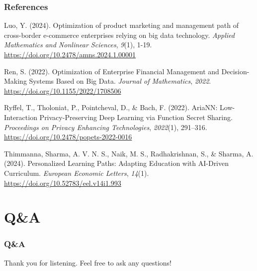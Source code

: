 \documentclass{beamer}
\begin{document}
\begin{frame}
\frametitle{References}

\footnotesize
\begin{thebibliography}{5}

 Luo, Y. (2024). Optimization of product marketing and management path of cross-border e-commerce enterprises relying on big data technology. \emph{Applied Mathematics and Nonlinear Sciences}, \emph{9}(1), 1-19. \href{https://doi.org/10.2478/amns.2024.1.00001}{https://doi.org/10.2478/amns.2024.1.00001}

 Ren, S. (2022). Optimization of Enterprise Financial Management and Decision-Making Systems Based on Big Data. \emph{Journal of Mathematics}, \emph{2022}. \href{https://doi.org/10.1155/2022/1708506}{https://doi.org/10.1155/2022/1708506}

 Ryffel, T., Tholoniat, P., Pointcheval, D., \& Bach, F. (2022). AriaNN: Low-Interaction Privacy-Preserving Deep Learning via Function Secret Sharing. \emph{Proceedings on Privacy Enhancing Technologies}, \emph{2022}(1), 291–316. \href{https://doi.org/10.2478/popets-2022-0016}{https://doi.org/10.2478/popets-2022-0016}

 Thimmanna, Sharma, A. V. N. S., Naik, M. S., Radhakrishnan, S., \& Sharma, A. (2024). Personalized Learning Paths: Adapting Education with AI-Driven Curriculum. \emph{European Economic Letters}, \emph{14}(1). \href{https://doi.org/10.52783/eel.v14i1.993}{https://doi.org/10.52783/eel.v14i1.993}

\end{thebibliography}
\normalsize
\end{frame}


\section{Q\&A}
\begin{frame}
\frametitle{Q\&A}
{\Large Thank you for listening. Feel free to ask any questions!}
\end{frame}
\end{document}
